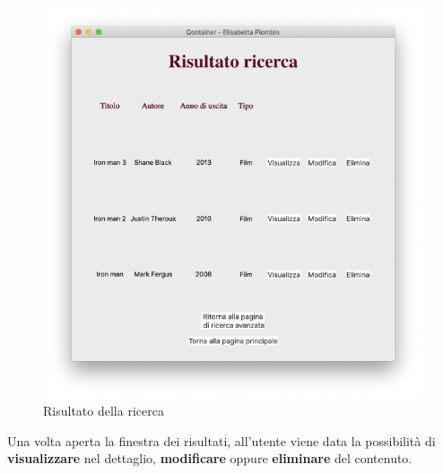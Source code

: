 \documentclass[a4paper,10pt]{article}
\begin{document}
\begin{figure}[H]
	\begin{center}
		\includegraphics[width=\textwidth,keepaspectratio]{immagini/RisultatoRicerca.png}
	\end{center}
	\caption{\label{fig:my-label} Risultato della ricerca}
\end{figure}
\noindent
Una volta aperta la finestra dei risultati, all'utente viene data la possibilit\`a di \textbf{visualizzare} nel dettaglio, \textbf{modificare} oppure \textbf{eliminare} del contenuto.
\end{document}
